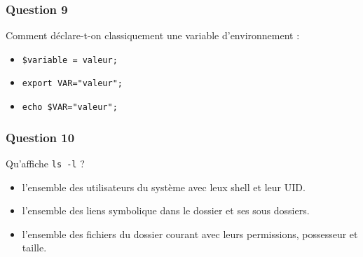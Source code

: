 \documentclass[
]{article}
\providecommand{\tightlist}{%
  \setlength{\itemsep}{0pt}\setlength{\parskip}{0pt}}
\begin{document}
\hypertarget{question-9}{%
\subsubsection{Question 9}\label{question-9}}

Comment déclare-t-on classiquement une variable d'environnement :

\begin{itemize}
\tightlist
\item
  \texttt{\$variable\ =\ valeur;}
\item
  \texttt{export\ VAR="valeur";}
\item
  \texttt{echo\ \$VAR="valeur";}
\end{itemize}

\hypertarget{question-10}{%
\subsubsection{Question 10}\label{question-10}}

Qu'affiche \texttt{ls\ -l} ?

\begin{itemize}
\tightlist
\item
  l'ensemble des utilisateurs du système avec leux shell et leur UID.
\item
  l'ensemble des liens symbolique dans le dossier et ses sous dossiers.
\item
  l'ensemble des fichiers du dossier courant avec leurs permissions,
  possesseur et taille.
\end{itemize}
\end{document}
